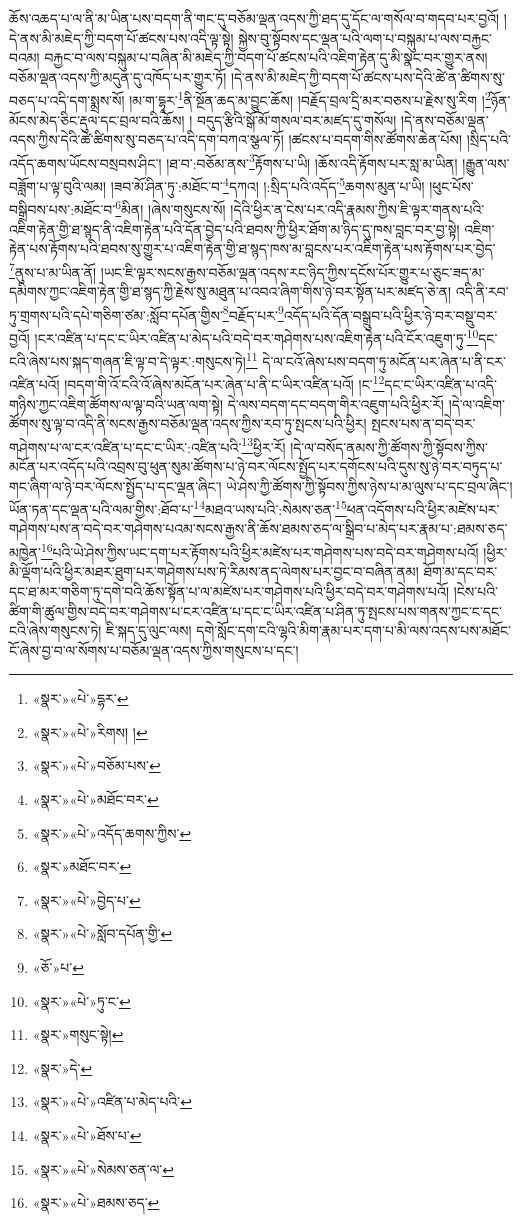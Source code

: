 ཆོས་འཆད་པ་ལ་ནི་མ་ཡིན་པས་བདག་ནི་གང་དུ་བཅོམ་ལྡན་འདས་ཀྱི་ཐད་དུ་དོང་ལ་གསོལ་བ་གདབ་པར་བྱའོ། །དེ་ནས་མི་མཇེད་ཀྱི་བདག་པོ་ཚངས་པས་འདི་ལྟ་སྟེ། སྐྱེས་བུ་སྟོབས་དང་ལྡན་པའི་ལག་པ་བསྐུམ་པ་ལས་བརྐྱང་བའམ། བརྐྱང་བ་ལས་བསྐུམ་པ་བཞིན་མི་མཇེད་ཀྱི་བདག་པོ་ཚངས་པའི་འཇིག་རྟེན་དུ་མི་སྣང་བར་གྱུར་ནས། བཅོམ་ལྡན་འདས་ཀྱི་མདུན་དུ་འཁོད་པར་གྱུར་ཏོ། །དེ་ནས་མི་མཇེད་ཀྱི་བདག་པོ་ཚངས་པས་དེའི་ཚེ་ན་ཚིགས་སུ་བཅད་པ་འདི་དག་སྨྲས་སོ། །མ་ག་དྷཱར་\footnote{«སྣར་»«པེ་»དྷར་}ནི་སྔོན་ཆད་མ་བྱུང་ཆོས། །བརྗོད་བྲལ་དྲི་མར་བཅས་པ་རྗེས་སུ་རིག །\footnote{«སྣར་»«པེ་»རིགས། །}ཉོན་མོངས་མེད་ཅིང་རྡུལ་དང་བྲལ་བའི་ཆོས། །
བདུད་རྩིའི་སྒོ་མོ་གསལ་བར་མཛད་དུ་གསོལ། །དེ་ནས་བཅོམ་ལྡན་འདས་ཀྱིས་དེའི་ཚེ་ཚིགས་སུ་བཅད་པ་འདི་དག་བཀའ་སྩལ་ཏོ། །ཚངས་པ་བདག་གིས་ཚོགས་ཆེན་པོས། །སྲིད་པའི་འདོད་ཆགས་ཡོངས་བསྲབས་ཤིང་། །ཐ་བ་:བཅོམ་ནས་\footnote{«སྣར་»«པེ་»བཅོམ་པས་}རྟོགས་པ་ཡི། །ཆོས་འདི་རྟོགས་པར་སླ་མ་ཡིན། །རྒྱུན་ལས་བཟློག་པ་ལྟ་བུའི་ལམ། །ཟབ་མོ་ཤིན་ཏུ་:མཐོང་བ་\footnote{«སྣར་»«པེ་»མཐོང་བར་}དཀའ། །:སྲིད་པའི་འདོད་\footnote{«སྣར་»«པེ་»འདོད་ཆགས་ཀྱིས་}ཆགས་མུན་པ་ཡི། །ཕུང་པོས་བསྒྲིབས་པས་:མཐོང་བ་\footnote{«སྣར་»མཐོང་བར་}མིན། །ཞེས་གསུངས་སོ། །དེའི་ཕྱིར་ན་ངེས་པར་འདི་རྣམས་ཀྱིས་ཇི་ལྟར་གནས་པའི་འཇིག་རྟེན་གྱི་ཐ་སྙད་ནི་འཇིག་རྟེན་པའི་དོན་བྱེད་པའི་ཐབས་ཀྱི་ཕྱིར་ཐོག་མ་ཉིད་དུ་ཁས་བླང་བར་བྱ་སྟེ། འཇིག་རྟེན་པས་རྟོགས་པའི་ཐབས་སུ་གྱུར་པ་འཇིག་རྟེན་གྱི་ཐ་སྙད་ཁས་མ་བླངས་པར་འཇིག་རྟེན་པས་རྟོགས་པར་བྱེད་\footnote{«སྣར་»«པེ་»བྱེད་པ་}ནུས་པ་མ་ཡིན་ནོ། །ཡང་ཇི་ལྟར་སངས་རྒྱས་བཅོམ་ལྡན་འདས་རང་ཉིད་ཀྱིས་དངོས་པོར་གྱུར་པ་ཅུང་ཟད་མ་དམིགས་ཀྱང་འཇིག་རྟེན་གྱི་ཐ་སྙད་ཀྱི་རྗེས་སུ་མཐུན་པ་འབའ་ཞིག་གིས་ཉེ་བར་སྟོན་པར་མཛད་ཅེ་ན། འདི་ནི་རབ་ཏུ་གྲགས་པའི་དཔེ་གཅིག་ཙམ་:སློབ་དཔོན་གྱིས་\footnote{«སྣར་»«པེ་»སློབ་དཔོན་གྱི་}བརྗོད་པར་\footnote{«ཅོ་»པ་}འདོད་པའི་དོན་བསྒྲུབ་པའི་ཕྱིར་ཉེ་བར་བསྡུ་བར་བྱའོ། །ངར་འཛིན་པ་དང་ང་ཡིར་འཛིན་པ་མེད་པའི་བདེ་བར་གཤེགས་པས་འཇིག་རྟེན་པའི་ངོར་འཇུག་ཏུ་\footnote{«སྣར་»«པེ་»ཏུ་ང་}དང་ངའི་ཞེས་པས་སྐད་གཞན་ཇི་ལྟ་བ་དེ་ལྟར་:གསུངས་ཏེ།\footnote{«སྣར་»གསུང་སྟེ།} དེ་ལ་ངའོ་ཞེས་པས་བདག་ཏུ་མངོན་པར་ཞེན་པ་ནི་ངར་འཛིན་པའོ། །བདག་གི་འོ་ངའི་འོ་ཞེས་མངོན་པར་ཞེན་པ་ནི་ང་ཡིར་འཛིན་པའོ། །ང་\footnote{«སྣར་»དེ་}དང་ང་ཡིར་འཛིན་པ་འདི་གཉིས་ཀྱང་འཇིག་ཚོགས་ལ་ལྟ་བའི་ཡན་ལག་སྟེ། དེ་ལས་བདག་དང་བདག་གིར་འཇུག་པའི་ཕྱིར་རོ། །དེ་ལ་འཇིག་ཚོགས་སུ་ལྟ་བ་འདི་ནི་སངས་རྒྱས་བཅོམ་ལྡན་འདས་ཀྱིས་རབ་ཏུ་སྤངས་པའི་ཕྱིར། སྤངས་པས་ན་བདེ་བར་གཤེགས་པ་ལ་ངར་འཛིན་པ་དང་ང་ཡིར་:འཛིན་པའི་\footnote{«སྣར་»«པེ་»འཛིན་པ་མེད་པའི་}ཕྱིར་རོ། །དེ་ལ་བསོད་ནམས་ཀྱི་ཚོགས་ཀྱི་སྟོབས་ཀྱིས་མངོན་པར་འདོད་པའི་འབྲས་བུ་ཕུན་སུམ་ཚོགས་པ་ཉེ་བར་ལོངས་སྤྱོད་པར་དགོངས་པའི་དུས་སུ་ཉེ་བར་བཏུད་པ་གང་ཞིག་ལ་ཉེ་བར་ལོངས་སྤྱོད་པ་དང་ལྡན་ཞིང་། ཡེ་ཤེས་ཀྱི་ཚོགས་ཀྱི་སྟོབས་ཀྱིས་ཉེས་པ་མ་ལུས་པ་དང་བྲལ་ཞིང་། ཡོན་ཏན་དང་ལྡན་པའི་ལམ་གྱིས་:ཐོབ་པ་\footnote{«སྣར་»«པེ་»ཐོས་པ་}མཐའ་ཡས་པའི་:སེམས་ཅན་\footnote{«སྣར་»«པེ་»སེམས་ཅན་ལ་}ཕན་འདོགས་པའི་ཕྱིར་མཛེས་པར་གཤེགས་པས་ན་བདེ་བར་གཤེགས་པའམ་སངས་རྒྱས་ནི་ཆོས་ཐམས་ཅད་ལ་སྒྲིབ་པ་མེད་པར་རྣམ་པ་:ཐམས་ཅད་མཁྱེན་\footnote{«སྣར་»«པེ་»ཐམས་ཅད་}པའི་ཡེ་ཤེས་ཀྱིས་ཡང་དག་པར་རྟོགས་པའི་ཕྱིར་མཛེས་པར་གཤེགས་པས་བདེ་བར་གཤེགས་པའོ། །ཕྱིར་མི་ལྡོག་པའི་ཕྱིར་མཐར་ཐུག་པར་གཤེགས་པས་ཏེ་རིམས་ནད་ལེགས་པར་བྱང་བ་བཞིན་ནམ། ཐོག་མ་དང་བར་དང་ཐ་མར་གཅིག་ཏུ་དགེ་བའི་ཆོས་སྟོན་པ་ལ་མཛེས་པར་གཤེགས་པའི་ཕྱིར་བདེ་བར་གཤེགས་པའོ། །ངེས་པའི་ཚིག་གི་ཚུལ་གྱིས་བདེ་བར་གཤེགས་པ་ངར་འཛིན་པ་དང་ང་ཡིར་འཛིན་པ་ཤིན་ཏུ་སྤངས་པས་གནས་ཀྱང་ང་དང་ངའི་ཞེས་གསུངས་ཏེ། ཇི་སྐད་དུ་ལུང་ལས། དགེ་སློང་དག་ངའི་ལྷའི་མིག་རྣམ་པར་དག་པ་མི་ལས་འདས་པས་མཐོང་ངོ་ཞེས་བྱ་བ་ལ་སོགས་པ་བཅོམ་ལྡན་འདས་ཀྱིས་གསུངས་པ་དང་། 